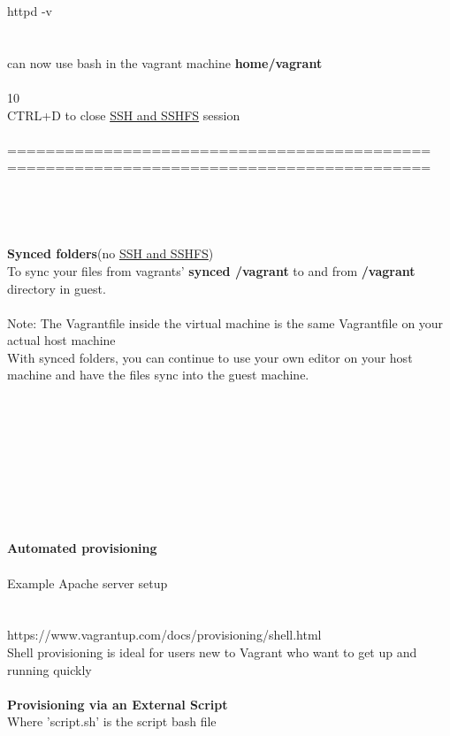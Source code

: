 \documentclass[10pt,a4paper]{article}
\begin{document}
{{{{{{{{{{{{{{{{{{{{{{{{httpd -v\\
\\
\\
can now use bash in the vagrant machine  \textbf{ home/vagrant} \\
\\
10\\
CTRL+D to close \hyperlink{ssh___and_sshfs}{SSH   and SSHFS} session\\
\\
============================================\\
============================================\\
\\
\\
\\
\\
\textbf{{\large Synced folders}}{\large  (no \hyperlink{ssh___and_sshfs}{SSH   and SSHFS}}{\large )}\\
To sync your files from vagrants' \textbf{synced /vagrant} to and from \textbf{/vagrant} directory in guest.\\
\\
Note: The Vagrantfile inside the virtual machine is the same Vagrantfile on your actual host machine\\
With synced folders, you can continue to use your own editor on your host machine and have the files sync into the guest machine.\\
\\
\\
\\
\\
\\
\\
\\
\\
\\
\textbf{Automated provisioning}\\
\\
Example Apache server setup\\
\\
\\
https://www.vagrantup.com/docs/provisioning/shell.html\\
Shell provisioning is ideal for users new to Vagrant who want to get up and running quickly\\
\\
\textbf{Provisioning via an External Script }\\
Where 'script.sh' is the script bash file\\
\\
}}}}}}}}}}}}}}}}}}}}}}}}
\end{document}
